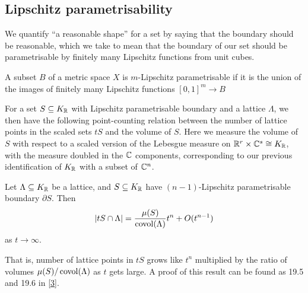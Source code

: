 \documentclass[11pt]{report}
\begin{document}
\subsection{Lipschitz parametrisability}
We quantify ``a reasonable shape'' for a set by saying that the boundary should be reasonable, which we take to mean that the boundary of our set should be parametrisable by finitely many Lipschitz functions from unit cubes.
\begin{definition}
    A subset $B$ of a metric space $X$ is $m$-Lipschitz parametrisable if it is the union of the images of finitely many Lipschitz functions $[0, 1]^m \to B$
\end{definition}
For a set $S \subseteq K_{\mathbb{R}}$ with Lipschitz parametrisable boundary and a lattice $\Lambda$, we then have the following point-counting relation between the number of lattice points in the scaled sets $tS$ and the volume of $S$. Here we measure the volume of $S$ with respect to a scaled version of the Lebesgue measure on $\mathbb{R}^r \times \mathbb{C}^s \cong K_{\mathbb{R}}$, with the measure doubled in the $\mathbb{C}$ components, corresponding to our previous identification of $K_{\mathbb{R}}$ with a subset of $\mathbb{C}^n$.
\begin{lemma}\label{ptcount}
    Let $\Lambda \subseteq K_{\mathbb{R}}$ be a lattice, and $S \subseteq K_{\mathbb{R}}$ have $(n - 1)$-Lipschitz parametrisable boundary $\partial S$. Then 
    $$
        \left| tS \cap \Lambda \right| = \frac{\mu(S)}{\operatorname{covol}(\Lambda)}t^n + O(t^{n - 1})
    $$
    as $t \to \infty$.
\end{lemma}
That is, number of lattice points in $tS$ grows like $t^n$ multiplied by the ratio of volumes $\mu(S)/\operatorname{covol}(\Lambda)$ as $t$ gets large. A proof of this result can be found as 19.5 and 19.6 in \hyperlink{sutherland}{[3]}.
\end{document}
